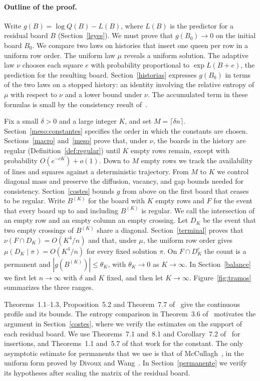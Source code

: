 \paragraph{Outline of the proof.}
Write $g(B)=\log Q(B)-L(B)$, where $L(B)$ is the predictor for a residual board $B$
(Section~\ref{leyes}). We must prove that $g(B_0)\to0$ on the initial board $B_0$. We compare two
laws on histories that insert one queen per row in a uniform row order. The uniform law
$\mu$ reveals a uniform solution. The adaptive law $\nu$ chooses each square $e$ with probability
proportional to $\exp L(B+e)$, the prediction for the resulting board. Section~\ref{historias}
expresses $g(B_0)$ in terms of the two laws on a stopped history: an identity involving the relative
entropy of $\mu$ with respect to $\nu$ and a lower bound under $\nu$. The accumulated term in these
formulas is small by the consistency result of~\cite{pred}.

Fix a small $\delta>0$ and a large integer $K$, and set $M=\lceil\delta n\rceil$.
Section~\ref{meso:constantes} specifies the order in which the constants are chosen.
Sections~\ref{macro} and~\ref{meso} prove that, under $\nu$, the boards in the history are regular
(Definition~\ref{def:regular}) until $K$ empty rows remain, except with probability
$O(e^{-cK})+o(1)$. Down to $M$ empty rows we track the availability of lines and squares
against a deterministic trajectory. From $M$ to $K$ we control diagonal mass and preserve the
diffusion, vacancy, and gap bounds needed for consistency.
Section~\ref{costes} bounds $g$ from above on the first board that ceases to be regular.
Write $B^{(K)}$ for the board with $K$ empty rows and $F$ for the event that every board up to
and including $B^{(K)}$ is regular. We call the intersection of an empty row and an empty column an
empty crossing. Let $D_K$ be the event that two empty crossings of
$B^{(K)}$ share a diagonal. Section~\ref{terminal} proves that
$\nu(F\cap D_K)=O(K^4/n)$ and that, under $\mu$, the uniform row order gives
$\mu(D_K\mid\pi)=O(K^4/n)$ for every fixed solution $\pi$. On $F\cap D_K^c$ the count is a
permanent and $|g(B^{(K)})|\le\theta_K$, with $\theta_K\to0$ as $K\to\infty$. In Section~\ref{balance}
we first let $n\to\infty$ with $\delta$ and $K$ fixed, and then let $K\to\infty$.
Figure~\ref{fig:tramos} summarizes the three ranges.

Theorems~1.1--1.3, Proposition~5.2 and Theorem~7.7 of~\cite{perfil} give the continuous profile
and its bounds. The entropy comparison in Theorem~3.6 of~\cite{ultimas} motivates the argument in
Section~\ref{costes}, where we verify the estimates on the support of each residual board. We use
Theorems~7.1 and~8.1 and Corollary~7.2 of~\cite{pred} for insertions, and Theorems~1.1 and~5.7 of
that work for the constant. The only asymptotic estimate for permanents that we use is that of
McCullagh~\cite{mccullagh}, in the uniform form proved by Divoux and
Wang~\cite[Proposition~3.1 and Remark~2.1]{dw}.
In Section~\ref{permanente} we verify its hypotheses after scaling the matrix of the residual
board.
